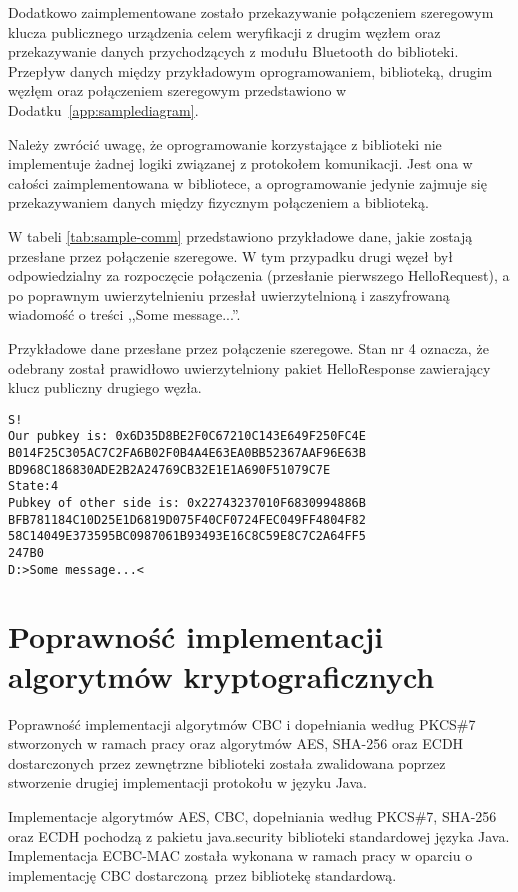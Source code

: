 Dodatkowo zaimplementowane zostało przekazywanie połączeniem szeregowym klucza publicznego urządzenia celem weryfikacji z drugim węzłem oraz przekazywanie danych przychodzących z modułu Bluetooth do biblioteki. Przepływ danych między przykładowym oprogramowaniem, biblioteką, drugim węzłęm oraz połączeniem szeregowym przedstawiono w Dodatku~\ref{app:samplediagram}.

Należy zwrócić uwagę, że oprogramowanie korzystające z biblioteki nie implementuje żadnej logiki związanej z protokołem komunikacji. Jest ona w całości zaimplementowana w bibliotece, a oprogramowanie jedynie zajmuje się przekazywaniem danych między fizycznym połączeniem a biblioteką.

W tabeli \ref{tab:sample-comm} przedstawiono przykładowe dane, jakie zostają przesłane przez połączenie szeregowe. W tym przypadku drugi węzeł był odpowiedzialny za rozpoczęcie połączenia (przesłanie pierwszego HelloRequest), a po poprawnym uwierzytelnieniu przesłał uwierzytelnioną i zaszyfrowaną wiadomość o treści ,,Some message...''.

\begin{table}
\centering
\caption{Przykładowe dane przesłane przez połączenie szeregowe. Stan nr 4 oznacza, że odebrany został prawidłowo uwierzytelniony pakiet HelloResponse zawierający klucz publiczny drugiego węzła.}
\begin{BVerbatim}
S!
Our pubkey is: 0x6D35D8BE2F0C67210C143E649F250FC4E
B014F25C305AC7C2FA6B02F0B4A4E63EA0BB52367AAF96E63B
BD968C186830ADE2B2A24769CB32E1E1A690F51079C7E
State:4
Pubkey of other side is: 0x22743237010F6830994886B
BFB781184C10D25E1D6819D075F40CF0724FEC049FF4804F82
58C14049E373595BC0987061B93493E16C8C59E8C7C2A64FF5
247B0
D:>Some message...<
\end{BVerbatim}
\label{tab:sample-comm}
\end{table}

\section{Poprawność implementacji algorytmów kryptograficznych}

Poprawność implementacji algorytmów CBC i dopełniania według PKCS\#7 stworzonych w ramach pracy oraz algorytmów AES, SHA-256 oraz ECDH dostarczonych przez zewnętrzne biblioteki została zwalidowana poprzez stworzenie drugiej implementacji protokołu w języku Java.

Implementacje algorytmów AES, CBC, dopełniania według PKCS\#7, SHA-256 oraz ECDH pochodzą z pakietu java.security biblioteki standardowej języka Java. Implementacja ECBC-MAC została wykonana w ramach pracy w oparciu o implementację CBC dostarczoną przez bibliotekę standardową.
